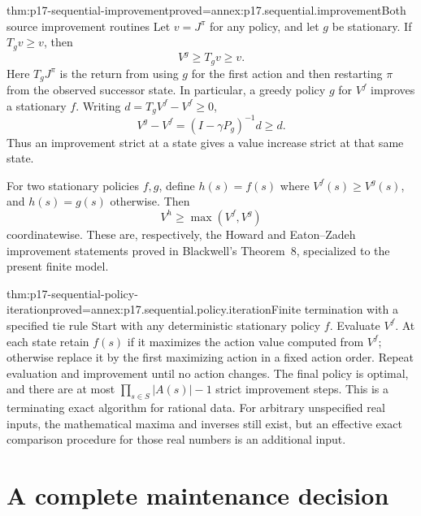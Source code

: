 \begin{hbtheorem}{thm:p17-sequential-improvement}{proved=annex:p17.sequential.improvement}{Both source improvement routines}
Let \(v=J^\pi\) for any policy, and let \(g\) be stationary.
If \(T_gv\geq v\), then
\[
                        V^g\geq T_gv\geq v.
\]
Here \(T_gJ^\pi\) is the return from using \(g\) for the
first action and then restarting \(\pi\) from the observed
successor state.
In particular, a greedy policy \(g\) for \(V^f\) improves
a stationary \(f\). Writing \(d=T_gV^f-V^f\geq0\),
\[
               V^g-V^f=(I-\gamma P_g)^{-1}d\geq d.
\]
Thus an improvement strict at a state gives a value increase
strict at that same state.

For two stationary policies \(f,g\), define \(h(s)=f(s)\)
where \(V^f(s)\geq V^g(s)\), and \(h(s)=g(s)\) otherwise.
Then
\[
                         V^h\geq\max(V^f,V^g)
\]
coordinatewise. These are, respectively, the Howard and
Eaton--Zadeh improvement statements proved in Blackwell's
Theorem~8, specialized to the present finite model.
\end{hbtheorem}

\begin{hbtheorem}{thm:p17-sequential-policy-iteration}{proved=annex:p17.sequential.policy.iteration}{Finite termination with a specified tie rule}
Start with any deterministic stationary policy \(f\).
Evaluate \(V^f\). At each state retain \(f(s)\) if it
maximizes the action value computed from \(V^f\); otherwise
replace it by the first maximizing action in a fixed action
order. Repeat evaluation and improvement until no action changes.
The final policy is optimal, and there are at most
\(\prod_{s\in S}|A(s)|-1\) strict improvement steps.
This is a terminating exact algorithm for rational data.
For arbitrary unspecified real inputs, the mathematical
maxima and inverses still exist, but an effective exact
comparison procedure for those real numbers is an additional input.
\end{hbtheorem}

\section{A complete maintenance decision}

